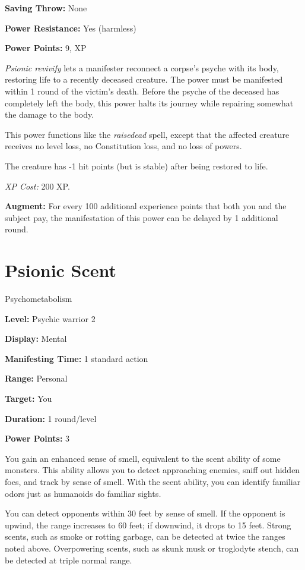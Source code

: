 \documentclass{article}
\begin{document}
\textbf{Saving Throw:} None

\textbf{Power Resistance:} Yes (harmless)

\textbf{Power Points:} 9, XP

\textit{Psionic revivify }lets a manifester reconnect a corpse's psyche with its 
body, restoring life to a recently deceased creature. The power must be manifested 
within 1 round of the victim's death. Before the psyche of the deceased has completely 
left the body, this power halts its journey while repairing somewhat the damage 
to the body.

This power functions like the \textit{raisedead }spell, except that the affected 
creature receives no level loss, no Constitution loss, and no loss of powers. 

The creature has -1 hit points (but is stable) after being restored to life.

\textit{XP Cost: }200 XP.

\textbf{Augment:} For every 100 additional experience points that both you and 
the subject pay, the manifestation of this power can be delayed by 1 additional 
round.

\vspace{12pt}
\section*{Psionic Scent}

Psychometabolism

\textbf{Level:} Psychic warrior 2

\textbf{Display:} Mental

\textbf{Manifesting Time:} 1 standard action

\textbf{Range:} Personal

\textbf{Target:} You

\textbf{Duration:} 1 round/level

\textbf{Power Points:} 3

You gain an enhanced sense of smell, equivalent to the scent ability of some monsters. 
This ability allows you to detect approaching enemies, sniff out hidden foes, and 
track by sense of smell. With the scent ability, you can identify familiar odors 
just as humanoids do familiar sights\textit{.}

You can detect opponents within 30 feet by sense of smell. If the opponent is upwind, 
the range increases to 60 feet; if downwind, it drops to 15 feet. Strong scents, 
such as smoke or rotting garbage, can be detected at twice the ranges noted above. 
Overpowering scents, such as skunk musk or troglodyte stench, can be detected at 
triple normal range.
\end{document}
